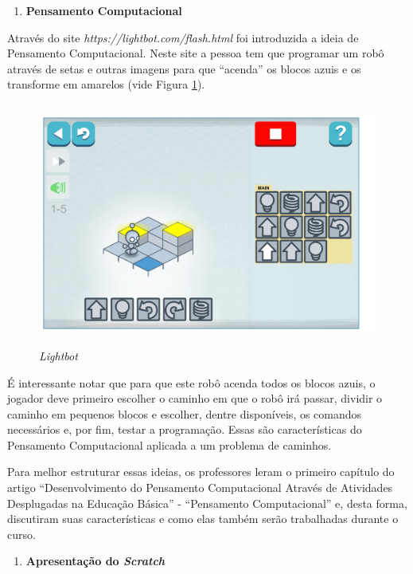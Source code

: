 \documentclass[12pt, openright, a4paper, brazil, english, french, spanish, bibjustif, openany, oneside]{abntex2}
\begin{document}
\begin{enumerate}[label=\textbf{\arabic*.}]

\item \textbf{Pensamento Computacional}

\end{enumerate}

Através do site \textit{https://lightbot.com/flash.html} foi introduzida a ideia de Pensamento Computacional. Neste site a pessoa tem que programar um robô através de setas e outras imagens para que ``acenda'' os blocos azuis e os transforme em amarelos (vide Figura \ref{robo2}).

\begin{figure}[H]

    \center
    \caption{ \textit{Lightbot} \label{robo2}}
    \includegraphics[height=8cm]{robo2.png}
    
\end{figure}

É interessante notar que para que este robô acenda todos os blocos azuis, o jogador deve primeiro escolher o caminho em que o robô irá passar, dividir o caminho em pequenos blocos e escolher, dentre disponíveis, os comandos necessários e, por fim, testar a programação. Essas são características do Pensamento Computacional aplicada a um problema de caminhos.

Para melhor estruturar essas ideias, os professores leram o primeiro capítulo do artigo ``Desenvolvimento do Pensamento Computacional Através de Atividades Desplugadas na Educação Básica'' - ``Pensamento Computacional'' \cite{brac} e, desta forma, discutiram suas características e como elas também serão trabalhadas durante o curso.

\begin{enumerate}[resume, label=\textbf{\arabic*.}]

\item \textbf{Apresentação do \textit{Scratch}}

\end{enumerate}
\end{document}
